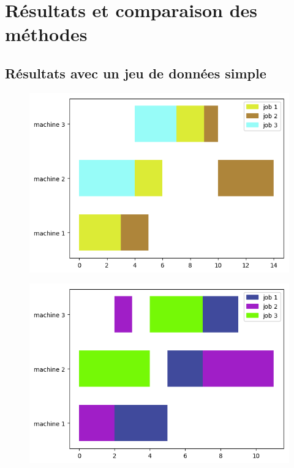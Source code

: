 \section{Résultats et comparaison des méthodes}

\subsection{Résultats avec un jeu de données simple}

\begin{figure}[!h]
    \centering
    \includegraphics[]{results/test_shortest_operation.png}
\end{figure}

\begin{figure}[!h]
    \centering
    \includegraphics[]{results/test_genetic.png}
\end{figure}

